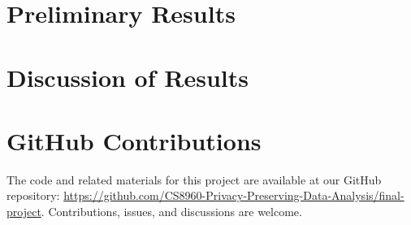 \documentclass{article}
\begin{document}
    \section{Preliminary Results}\label{sec:prelim-results}
    

 
    \section{Discussion of Results}\label{sec:results-discussion}
    

    
    

    \section*{GitHub Contributions}
    The code and related materials for this project are available at our GitHub repository:
    \url{https://github.com/CS8960-Privacy-Preserving-Data-Analysis/final-project}.
    Contributions, issues, and discussions are welcome.

    \break
\end{document}
